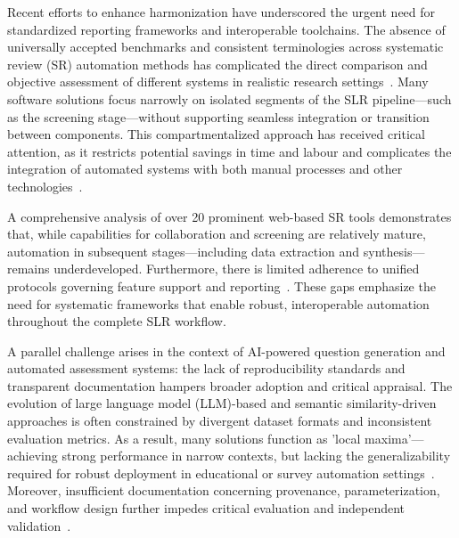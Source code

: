Recent efforts to enhance harmonization have underscored the urgent need for standardized reporting frameworks and interoperable toolchains. The absence of universally accepted benchmarks and consistent terminologies across systematic review (SR) automation methods has complicated the direct comparison and objective assessment of different systems in realistic research settings~\cite{ref37,ref63,ref86,ref106}. Many software solutions focus narrowly on isolated segments of the SLR pipeline—such as the screening stage—without supporting seamless integration or transition between components. This compartmentalized approach has received critical attention, as it restricts potential savings in time and labour and complicates the integration of automated systems with both manual processes and other technologies~\cite{ref29,ref37,ref38,ref80}.

A comprehensive analysis of over 20 prominent web-based SR tools demonstrates that, while capabilities for collaboration and screening are relatively mature, automation in subsequent stages—including data extraction and synthesis—remains underdeveloped. Furthermore, there is limited adherence to unified protocols governing feature support and reporting~\cite{ref29,ref62,ref63,ref68,ref78}. These gaps emphasize the need for systematic frameworks that enable robust, interoperable automation throughout the complete SLR workflow.

A parallel challenge arises in the context of AI-powered question generation and automated assessment systems: the lack of reproducibility standards and transparent documentation hampers broader adoption and critical appraisal. The evolution of large language model (LLM)-based and semantic similarity-driven approaches is often constrained by divergent dataset formats and inconsistent evaluation metrics. As a result, many solutions function as 'local maxima'—achieving strong performance in narrow contexts, but lacking the generalizability required for robust deployment in educational or survey automation settings~\cite{ref1,ref2,ref5,ref9,ref10}. Moreover, insufficient documentation concerning provenance, parameterization, and workflow design further impedes critical evaluation and independent validation~\cite{ref9,ref30,ref43,ref61,ref96,ref98}.

